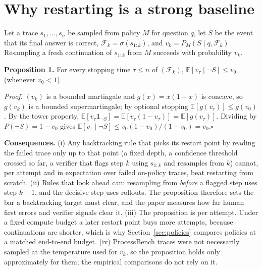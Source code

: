 \appendix
\section{Why restarting is a strong baseline}\label{app:prop}
Let a trace $s_1,\dots,s_n$ be sampled from policy $M$ for question $q$, let $S$ be the event that
its final answer is correct, $\mathcal{F}_k=\sigma(s_{1:k})$, and $v_k=P_M(S\mid q,\mathcal{F}_k)$.
Resampling a fresh continuation of $s_{1:k}$ from $M$ succeeds with probability $v_k$.

\textbf{Proposition 1.} For every stopping time $\tau\le n$ of $(\mathcal{F}_k)$,
$\mathbb{E}[v_\tau\mid \neg S]\le v_0$ (whenever $v_0<1$).

\emph{Proof.} $(v_k)$ is a bounded martingale and $g(x)=x(1-x)$ is concave, so $g(v_k)$ is a
bounded supermartingale; by optional stopping $\mathbb{E}[g(v_\tau)]\le g(v_0)$. By the tower
property, $\mathbb{E}[v_\tau\mathbf{1}_{\neg S}]=\mathbb{E}[v_\tau(1-v_\tau)]=\mathbb{E}[g(v_\tau)]$.
Dividing by $P(\neg S)=1-v_0$ gives $\mathbb{E}[v_\tau\mid\neg S]\le v_0(1-v_0)/(1-v_0)=v_0$.\hfill$\square$

\textbf{Consequences.} (i) Any backtracking rule that picks its restart point by reading the failed
trace only up to that point (a fixed depth, a confidence threshold crossed so far, a verifier that
flags step $k$ using $s_{1:k}$ and resamples from $k$) cannot, per attempt and in expectation over
failed on-policy traces, beat restarting from scratch. (ii) Rules that look ahead can: resampling
from \emph{before} a flagged step uses step $k+1$, and the decisive step uses rollouts. The
proposition therefore sets the bar a backtracking target must clear, and the paper measures how far
human first errors and verifier signals clear it. (iii) The proposition is per attempt. Under a
fixed compute budget a later restart point buys more attempts, because continuations are shorter,
which is why Section~\ref{sec:policies} compares policies at a matched end-to-end budget.
(iv) ProcessBench traces were not necessarily sampled at the temperature used for $v_k$, so the
proposition holds only approximately for them; the empirical comparisons do not rely on it.

